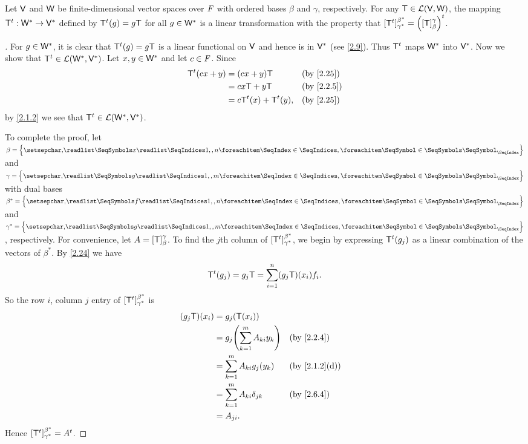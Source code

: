 \begin{thm}\label{2.25}
  Let \(\mathsf{V}\) and \(\mathsf{W}\) be finite-dimensional vector spaces over \(\mathit{F}\) with ordered bases \(\beta\) and \(\gamma\), respectively.
  For any \(\mathsf{T} \in \mathcal{L}(\mathsf{V}, \mathsf{W})\), the mapping \({\mathsf{T}}^{t} : \mathsf{W}^* \to \mathsf{V}^*\) defined by \({\mathsf{T}}^{t}(g) = g \mathsf{T}\) for all \(g \in \mathsf{W}^*\) is a linear transformation with the property that \([{\mathsf{T}}^{t}]_{\gamma^*}^{\beta^*} = {\left\lparen[\mathsf{T}]_{\beta}^{\gamma}\right\rparen}^{t}\).
\end{thm}

\begin{proof}[]
  For \(g \in \mathsf{W}^*\), it is clear that \({\mathsf{T}}^{t}(g) = g \mathsf{T}\) is a linear functional on \(\mathsf{V}\) and hence is in \(\mathsf{V}^*\) (see \cref{2.9}).
  Thus \({\mathsf{T}}^{t}\) maps \(\mathsf{W}^*\) into \(\mathsf{V}^*\).
  Now we show that \({\mathsf{T}}^{t} \in \mathcal{L}(\mathsf{W}^*, \mathsf{V}^*)\).
  Let \(x, y \in \mathsf{W}^*\) and let \(c \in \mathit{F}\).
  Since
  \begin{align*}
    \tp{\T}(cx + y) & = (cx + y) \T                &  & \text{(by \cref{2.25})}  \\
                    & = c x \T + y \T              &  & \text{(by \cref{2.2.5})} \\
                    & = c \tp{\T}(x) + \tp{\T}(y), &  & \text{(by \cref{2.25})}
  \end{align*}
  by \cref{2.1.2} we see that \({\mathsf{T}}^{t} \in \mathcal{L}(\mathsf{W}^*, \mathsf{V}^*)\).

  To complete the proof, let \(\beta = \set{\seq{x}{1,,n}}\) and \(\gamma = \set{\seq{y}{1,,m}}\) with dual bases \(\beta^* = \set{\seq{f}{1,,n}}\) and \(\gamma^* = \set{\seq{g}{1,,m}}\), respectively.
  For convenience, let \(A = [\mathsf{T}]_{\beta}^{\gamma}\).
  To find the \(j\)th column of \([{\mathsf{T}}^{t}]_{\gamma^*}^{\beta^*}\), we begin by expressing \({\mathsf{T}}^{t}(g_j)\) as a linear combination of the vectors of \(\beta^*\).
  By \cref{2.24} we have
  \[
    {\mathsf{T}}^{t}(g_j) = g_j \mathsf{T} = \sum_{i = 1}^n (g_j \mathsf{T})(x_i) f_i.
  \]
  So the row \(i\), column \(j\) entry of \([{\mathsf{T}}^{t}]_{\gamma^*}^{\beta^*}\) is
  \begin{align*}
    (g_j \T)(x_i) & = g_j(\T(x_i))                                                         \\
                  & = g_j \pa{\sum_{k = 1}^m A_{k i} y_k} &  & \text{(by \cref{2.2.4})}    \\
                  & = \sum_{k = 1}^m A_{k i} g_j(y_k)     &  & \text{(by \cref{2.1.2}(d))} \\
                  & = \sum_{k = 1}^m A_{k i} \delta_{j k} &  & \text{(by \cref{2.6.4})}    \\
                  & = A_{j i}.
  \end{align*}
  Hence \([{\mathsf{T}}^{t}]_{\gamma^*}^{\beta^*} = {A}^{t}\).
\end{proof}

